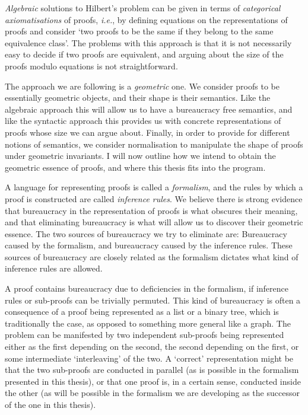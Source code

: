 
\emph{Algebraic} solutions to Hilbert's problem can be given in terms of \emph{categorical axiomatisations} of proofs, \emph{i.e.}, by defining equations on the representations of proofs and consider `two proofs to be the same if they belong to the same equivalence class'. The problems with this approach is that it is not necessarily easy to decide if two proofs are equivalent, and arguing about the size of the proofs modulo equations is not straightforward.


The approach we are following is a \emph{geometric} one. We consider proofs to be essentially geometric objects, and their shape is their semantics. Like the algebraic approach this will allow us to have a bureaucracy free semantics, and like the syntactic approach this provides us with concrete representations of proofs whose size we can argue about. Finally, in order to provide for different notions of semantics, we consider normalisation to manipulate the shape of proofs under geometric invariants. I will now outline how we intend to obtain the geometric essence of proofs, and where this thesis fits into the program.

A language for representing proofs is called a \emph{formalism}, and the rules by which a proof is constructed are called \emph{inference rules}. We believe there is strong evidence that bureaucracy in the representation of proofs is what obscures their meaning, and that eliminating bureaucracy is what will allow us to discover their geometric essence. The two sources of bureaucracy we try to eliminate are: Bureaucracy caused by the formalism, and bureaucracy caused by the inference rules. These sources of bureaucracy are closely related as the formalism dictates what kind of inference rules are allowed.

A proof contains bureaucracy due to deficiencies in the formalism, if inference rules or sub-proofs can be trivially permuted. This kind of bureaucracy is often a consequence of a proof being represented as a list or a binary tree, which is traditionally the case, as opposed to something more general like a graph. The problem can be manifested by two independent sub-proofs being represented either as the first depending on the second, the second depending on the first, or some intermediate `interleaving' of the two. A `correct' representation might be that the two sub-proofs are conducted in parallel (as is possible in the formalism presented in this thesis), or that one proof is, in a certain sense, conducted inside the other (as will be possible in the formalism we are developing as the successor of the one in this thesis).

